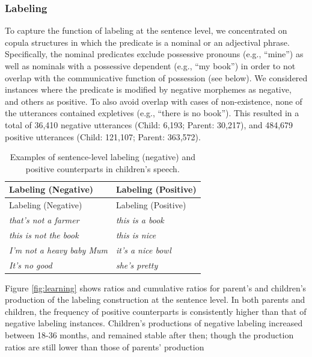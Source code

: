 \documentclass[
  english,
  man,floatsintext]{apa6}
\begin{document}
\hypertarget{labeling}{%
\subsubsection{Labeling}\label{labeling}}

To capture the function of labeling at the sentence level, we concentrated on copula structures in which the predicate is a nominal or an adjectival phrase. Specifically, the nominal predicates exclude possessive pronouns (e.g., ``mine'') as well as nominals with a possessive dependent (e.g., ``my book'') in order to not overlap with the communicative function of possession (see below). We considered instances where the predicate is modified by negative morphemes as negative, and others as positive. To also avoid overlap with cases of non-existence, none of the utterances contained expletives (e.g., ``there is no book''). This resulted in a total of 36,410 negative utterances (Child: 6,193; Parent: 30,217), and 484,679 positive utterances (Child: 121,107; Parent: 363,572).

\begin{longtable}[]{@{}ll@{}}
\caption{\label{tab:label} Examples of sentence-level labeling (negative) and positive counterparts in children's speech.}\tabularnewline
\toprule
Labeling (Negative) & Labeling (Positive) \\
\midrule
\endfirsthead
\toprule
Labeling (Negative) & Labeling (Positive) \\
\midrule
\endhead
\emph{that's not a farmer} & \emph{this is a book} \\
\emph{this is not the book} & \emph{this is nice} \\
\emph{I'm not a heavy baby Mum} & \emph{it's a nice bowl} \\
\emph{It's no good} & \emph{she's pretty} \\
\bottomrule
\end{longtable}

Figure \ref{fig:learning} shows ratios and cumulative ratios for parent's and children's production of the labeling construction at the sentence level. In both parents and children, the frequency of positive counterparts is consistently higher than that of negative labeling instances. Children's productions of negative labeling increased between 18-36 months, and remained stable after then; though the production ratios are still lower than those of parents' production
\end{document}
